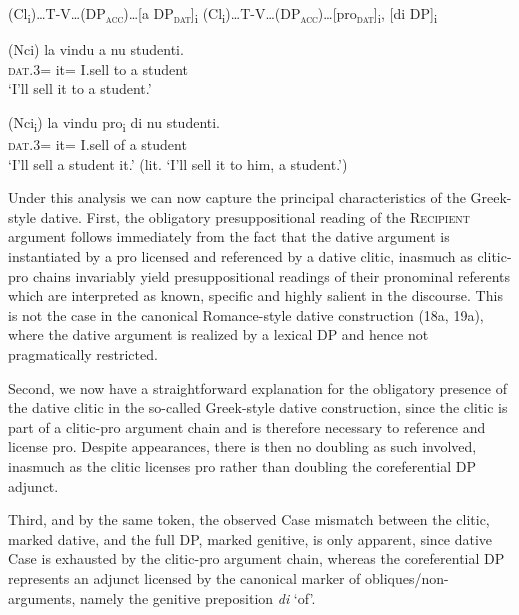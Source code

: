 \documentclass[output=paper,modfonts,nonflat,colorlinks,citecolor=brown]{langsci/langscibook}
\begin{document}
\ea\label{ex:ledgeway:18}
\ea  (Cl\textsubscript{i})…T-V…(DP\textsc{\textsubscript{acc}}\textsc{)}…[a  DP\textsc{\textsubscript{dat}}]\textsubscript{i}
\ex *(Cl\textsubscript{i})…T-V…(DP\textsc{\textsubscript{acc}}\textsc{)}…[pro\textsc{\textsubscript{dat}}]\textsubscript{i}, [di DP]\textsubscript{i}
\z
\z

\ea\label{ex:ledgeway:19}
\ea
	\gll (Nci)  la  vindu  a  nu  studenti.\\
    \textsc{dat}.3=  it=  I.sell  to  a  student\\
    \glt `I’ll sell it to a student.'

\ex  *(Nci\textsubscript{i}) la vindu pro\textsubscript{i} di  nu  studenti.\\
      \textsc{dat}.3= it= I.sell { } of a student\\
    \glt `I’ll sell a student it.' (lit. `I’ll sell it to him, a student.')
    \z
    \z

Under this analysis we can now capture the principal characteristics of the Greek-style dative. First, the obligatory presuppositional reading of the \textsc{Recipient} argument follows immediately from the fact that the dative argument is instantiated by a pro licensed and referenced by a dative clitic, inasmuch as clitic-pro chains invariably yield presuppositional readings of their pronominal referents which are interpreted as known, specific and highly salient in the discourse. This is not the case in the canonical Romance-style dative construction (18a, 19a), where the dative argument is realized by a lexical DP and hence not pragmatically restricted.

Second, we now have a straightforward explanation for the obligatory presence of the dative clitic in the so-called Greek-style dative construction, since the clitic is part of a clitic-pro argument chain and is therefore necessary to reference and license pro. Despite appearances, there is then no doubling as such involved, inasmuch as the clitic licenses pro rather than doubling the coreferential DP adjunct. 

Third, and by the same token, the observed Case mismatch between the clitic, marked dative, and the full DP, marked genitive, is only apparent, since dative Case is exhausted by the clitic-pro argument chain, whereas the coreferential DP represents an adjunct licensed by the canonical marker of obliques/non-arguments, namely the genitive preposition \textit{di} ‘of’. 
\end{document}
